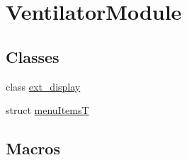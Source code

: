 \hypertarget{group___ventilator_module}{}\section{Ventilator\+Module}
\label{group___ventilator_module}
\subsection*{Classes}
\begin{DoxyCompactItemize}
\item 
class \hyperlink{classext__display}{ext\+\_\+display}
\item 
struct \hyperlink{structmenu_items_t}{menu\+ItemsT}
\end{DoxyCompactItemize}
\subsection*{Macros}
